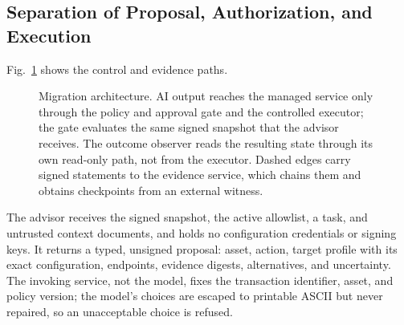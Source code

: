 \subsection{Separation of Proposal, Authorization, and Execution}
Fig.~\ref{fig:arch} shows the control and evidence paths.
\begin{figure}[t]
\centering
{}
\caption{Migration architecture. AI output reaches the managed service only through the policy and approval gate and the controlled executor; the gate evaluates the same signed snapshot that the advisor receives. The outcome observer reads the resulting state through its own read-only path, not from the executor. Dashed edges carry signed statements to the evidence service, which chains them and obtains checkpoints from an external witness.}
\label{fig:arch}
\end{figure}
The advisor receives the signed snapshot, the active allowlist, a task, and untrusted context documents, and holds no configuration credentials or signing keys. It returns a typed, unsigned proposal: asset, action, target profile with its exact configuration, endpoints, evidence digests, alternatives, and uncertainty. The invoking service, not the model, fixes the transaction identifier, asset, and policy version; the model's choices are escaped to printable ASCII but never repaired, so an unacceptable choice is refused.

